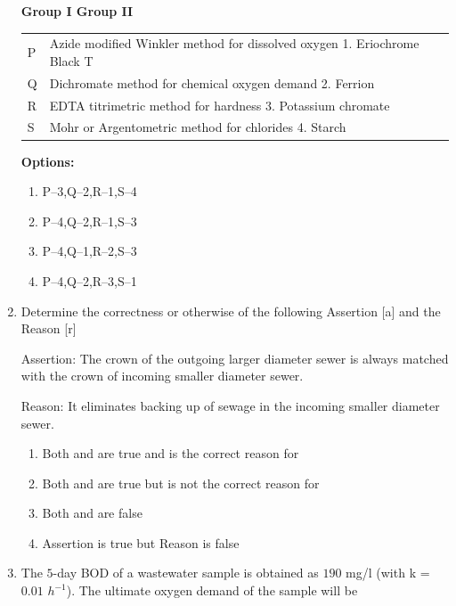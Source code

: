 \documentclass[journal]{IEEEtran}
\begin{document}
\begin{enumerate}
\vspace{1cm}
\textbf{Group I \hfill Group II}

\begin{tabular}{ll}
P & Azide modified Winkler method for dissolved oxygen \hfill 1. Eriochrome Black T \\
Q & Dichromate method for chemical oxygen demand \hfill 2. Ferrion \\
R & EDTA titrimetric method for hardness \hfill 3. Potassium chromate \\
S & Mohr or Argentometric method for chlorides \hfill 4. Starch \\
\end{tabular}

\vspace{0.5cm}

\textbf{Options:}
\begin{enumerate}
  \item P--3,\quad Q--2,\quad R--1,\quad S--4
  \item P--4,\quad Q--2,\quad R--1,\quad S--3
  \item P--4,\quad Q--1,\quad R--2,\quad S--3
  \item P--4,\quad Q--2,\quad R--3,\quad S--1
\end{enumerate}


\item Determine the correctness or otherwise of the following Assertion [a] and the Reason [r]
\vspace{0.1cm}

Assertion: The crown of the outgoing larger diameter sewer is always matched with the crown of
incoming smaller diameter sewer.
\vspace{0.1cm}

Reason: It eliminates backing up of sewage in the incoming smaller diameter sewer. \hfill {}

\begin{enumerate}
\item Both  and  are true and  is the correct reason for 
\item Both  and  are true but  is not the correct reason for 
\item Both  and  are false 
\item Assertion  is true but Reason is false 
\end{enumerate}     

\item The $5$-day BOD of a wastewater sample is obtained as $190$ mg/l (with k = $0.01$  $h^{-1}$). The ultimate oxygen demand  of the sample will be \hfill {}


\end{enumerate}
\end{document}
